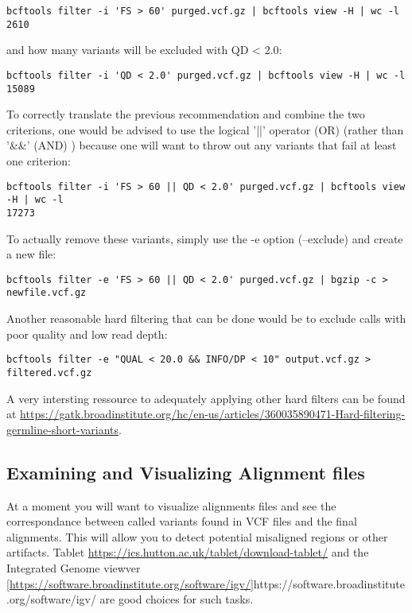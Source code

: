 \begin{verbatim}
bcftools filter -i 'FS > 60' purged.vcf.gz | bcftools view -H | wc -l
2610
\end{verbatim}

and how many variants will be excluded with QD < 2.0:

\begin{verbatim}
bcftools filter -i 'QD < 2.0' purged.vcf.gz | bcftools view -H | wc -l
15089
\end{verbatim}


To correctly translate the previous recommendation and combine the two criterions, one would be advised to use the logical '||' operator (OR) (rather than '\&\&' (AND) ) because one will want to throw out any variants that fail at least one criterion:

\begin{verbatim}
bcftools filter -i 'FS > 60 || QD < 2.0' purged.vcf.gz | bcftools view -H | wc -l
17273
\end{verbatim}


To actually remove these variants, simply use the -e option (--exclude) and create a new file:

\begin{verbatim}
bcftools filter -e 'FS > 60 || QD < 2.0' purged.vcf.gz | bgzip -c > newfile.vcf.gz
\end{verbatim}


Another reasonable hard filtering that can be done would be to exclude calls with poor quality and low read depth:

\begin{verbatim}
bcftools filter -e "QUAL < 20.0 && INFO/DP < 10" output.vcf.gz > filtered.vcf.gz
\end{verbatim}

A very intersting ressource to adequately applying other hard filters can be found at \href{https://gatk.broadinstitute.org/hc/en-us/articles/360035890471-Hard-filtering-germline-short-variants}{https://gatk.broadinstitute.org/hc/en-us/articles/360035890471-Hard-filtering-germline-short-variants}.




\subsection{Examining and Visualizing Alignment files}

At a moment you will want to visualize alignments files and see the correspondance between called variants found in VCF files and the final alignments. This will allow you to detect potential misaligned regions or other artifacts. Tablet \href{https://ics.hutton.ac.uk/tablet/download-tablet/}{https://ics.hutton.ac.uk/tablet/download-tablet/} and the Integrated Genome viewver \ref{https://software.broadinstitute.org/software/igv/}{https://software.broadinstitute.org/software/igv/} are good choices for such tasks.

